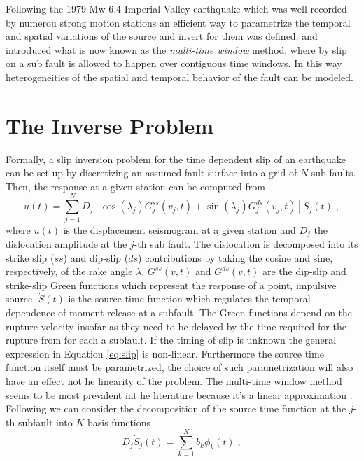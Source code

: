 Following the 1979 Mw 6.4 Imperial Valley earthquake which was well recorded by numerou strong motion stations an efficient way to parametrize the temporal and spatial variations of the source and invert for them was defined. \citet{olson1982} and \citet{hartzell1983} introduced what is now known as the \textit{multi-time window} method, where by slip on a sub fault is allowed to happen over contiguous time windows. In this way heterogeneities of the spatial and temporal behavior of the fault can be modeled.

\section{The Inverse Problem}

Formally, a slip inversion problem for the time dependent slip of an earthquake can be set up by discretizing an assumed fault surface into a grid of $N$ sub faults. Then, the response at a given station can be computed from
\begin{equation}
\label{eq:slip}
u(t)=\sum_{j=1}^ND_j[\cos(\lambda_j)G_j^{ss}(v_j,t)+\sin(\lambda_j)G_j^{ds}(v_j,t)]\dot{S}_j(t)\;,
\end{equation}
where $u(t)$ is the displacement seismogram at a given station and $D_j$ the dislocation amplitude at the $j$-th sub fault. The dislocation is decomposed into its strike slip ($ss$) and dip-slip ($ds$) contributions by taking the cosine and sine, respectively, of the rake angle $\lambda$. $G^{ss}(v,t)$ and $G^{ds}(v,t)$ are the dip-slip and strike-slip Green functions which represent the response of a point, impulsive source. $\dot{S}(t)$ is the source time function which regulates the temporal dependence of moment release at a subfault. The Green functions depend on the rupture velocity insofar as they need to be delayed by the time required for the rupture from for each a subfault. If the timing of slip is unknown the general expression in Equation \ref{eq:slip} is non-linear. Furthermore the source time function itself must be parametrized, the choice of such parametrization will also have an effect not he linearity of the problem.
	The multi-time window method seems to be most prevalent int he literature because it's a linear approximation \citep{ide2007}. Following \citep{ide1996} we can consider the decomposition of the source time function at the $j$-th subfault into $K$ basis functions
\begin{equation}
D_j\dot{S}_j(t)=\sum_{k=1}^Kb_k\phi_k(t)\;,
\end{equation}
